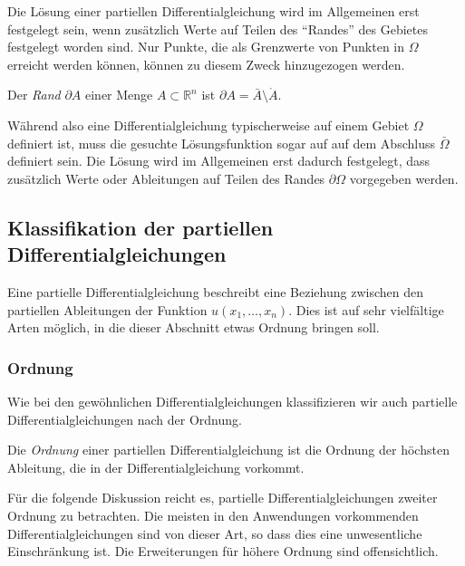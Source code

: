 Die Lösung einer partiellen Differentialgleichung wird im Allgemeinen erst
festgelegt sein, wenn zusätzlich Werte auf Teilen des ``Randes'' des
Gebietes festgelegt worden sind.
Nur Punkte, die als Grenzwerte von Punkten in $\Omega$ erreicht werden
können, können zu diesem Zweck hinzugezogen werden.

\begin{definition}
Der {\em Rand} $\partial A$ einer Menge $A\subset\mathbb R^n$ ist
$\partial A=\bar{A}\setminus\mathring{A}$.
\end{definition}

Während also eine Differentialgleichung typischerweise auf einem
Gebiet $\Omega$ definiert ist, muss die gesuchte Lösungsfunktion
sogar auf auf dem Abschluss $\bar{\Omega}$ definiert sein.
Die Lösung wird im Allgemeinen erst dadurch festgelegt, dass zusätzlich
Werte oder Ableitungen auf Teilen des Randes $\partial\Omega$ 
vorgegeben werden.

\subsection{Klassifikation der partiellen Differentialgleichungen
\label{subsection:pde:klassifikation}}
Eine partielle Differentialgleichung beschreibt eine Beziehung 
zwischen den partiellen Ableitungen der Funktion $u(x_1,\dots,x_n)$.
Dies ist auf sehr vielfältige Arten möglich, in die dieser Abschnitt
etwas Ordnung bringen soll.

\subsubsection{Ordnung}
Wie bei den gewöhnlichen Differentialgleichungen klassifizieren wir
auch partielle Differentialgleichungen nach der Ordnung.
%

\begin{definition}
Die {\em Ordnung} einer partiellen Differentialgleichung ist die
Ordnung der höchsten Ableitung, die in der Differentialgleichung
vorkommt.
%
\end{definition}

Für die folgende Diskussion reicht es, partielle Differentialgleichungen
zweiter Ordnung zu betrachten.
Die meisten in den Anwendungen vorkommenden Differentialgleichungen
sind von dieser Art, so dass dies eine unwesentliche Einschränkung ist.
Die Erweiterungen für höhere Ordnung sind offensichtlich.

